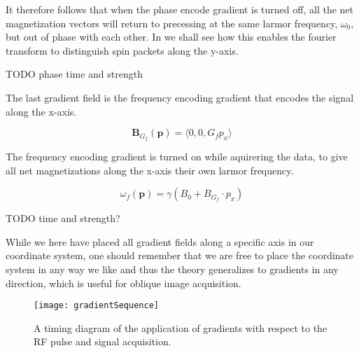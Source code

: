 It therefore follows that when the phase encode gradient is turned
off, all the net magnetization vectors will return to precessing at
the same larmor frequency, $\omega_0$, but out of phase with each
other. In  we shall see how this enables the
fourier transform to distinguish spin packets along the y-axis.

TODO phase time and strength



The last gradient field is the frequency encoding gradient that
encodes the signal along the x-axis.

\begin{displaymath}
  \mathbf{B}_{G_f}(\mathbf{p}) = \langle 0, 0, G_f p_x \rangle
\end{displaymath}

The frequency encoding gradient is turned on while aquirering the
data, to give all net magnetizations along the x-axis their own larmor
frequency.

\begin{displaymath}
  \omega_f(\mathbf{p}) = \gamma (B_0 + B_{G_f} \cdot p_x)
\end{displaymath}

TODO time and strength?

While we here have placed all gradient fields along a specific axis in
our coordinate system, one should remember that we are free to place
the coordinate system in any way we like and thus the theory
generalizes to gradients in any direction, which is useful for oblique
image acquisition.

\begin{figure}
  \centering
  \texttt{[image: gradientSequence]}
  \caption{A timing diagram of the application of gradients with
    respect to the RF pulse and signal acquisition.}
  \label{fig:gradientSequence}
\end{figure}





